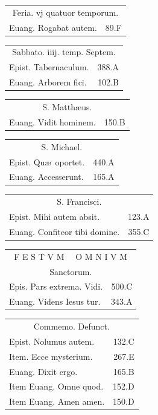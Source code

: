 \documentclass[a5paper,10pt]{book}
\def\ae{æ}
\begin{document}
\begin{multicols}{2}
\begin{tabular}{l r}
\end{tabular}
\begin{tabular}{l r}
\multicolumn{2}{c}{\color{red} Feria. vj quatuor temporum.}\\
Euang. Rogabat autem. & 89.F\\
\end{tabular}
\begin{tabular}{l r}
\multicolumn{2}{c}{\color{red} Sabbato. iiij. temp. Septem.}\\
Epist. Tabernaculum. & 388.A\\
Euang. Arborem fici. & 102.B\\
\end{tabular}
\begin{tabular}{l r}
\multicolumn{2}{c}{\color{red} S. Matth\ae us.}\\
Euang. Vidit hominem. & 150.B\\
\end{tabular}
\begin{tabular}{l r}
\multicolumn{2}{c}{\color{red} S. Michael.}\\
Epist. Qu\ae \ oportet. & 440.A\\
Euang. Accesserunt. & 165.A\\
\end{tabular}
\begin{tabular}{l r}
\multicolumn{2}{c}{\color{red} S. Francisci.}\\
Epist. Mihi autem absit. & 123.A\\
Euang. Confiteor tibi domine. & 355.C\\
\end{tabular}
\begin{tabular}{l r}
\multicolumn{2}{c}{\color{red} \large F E S T V M \ \ O M N I V M}\\
\multicolumn{2}{c}{\color{red} Sanctorum.}\\
Epis. Pars extrema. Vidi. & 500.C\\
Euang. Videns Iesus tur. & 343.A\\
\end{tabular}
\begin{tabular}{l r}
\multicolumn{2}{c}{\color{red} Commemo. Defunct.}\\
Epist. Nolumus autem. & 132.C\\
Item. Ecce mysterium. & 267.E\\
Euang. Dixit ergo. & 165.B\\
Item Euang. Omne quod. & 152.D\\
Item Euang. Amen amen. & 150.D\\

\end{tabular}
\end{multicols}
\end{document}
